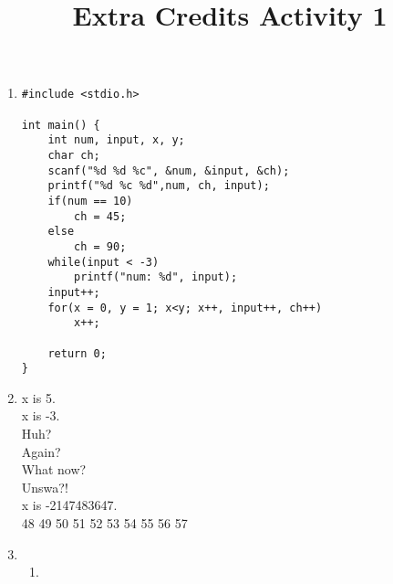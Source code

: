 \documentclass[12pt,letterpaper]{article}
\title{Extra Credits Activity 1}
\date{}
\begin{document}
    \maketitle

    \begin{enumerate}[label=\Roman*]
        \item 
        \begin{lstlisting}
#include <stdio.h>

int main() {
    int num, input, x, y;
    char ch;
    scanf("%d %d %c", &num, &input, &ch);
    printf("%d %c %d",num, ch, input);
    if(num == 10)
        ch = 45;
    else
        ch = 90;
    while(input < -3)
        printf("num: %d", input);
    input++;
    for(x = 0, y = 1; x<y; x++, input++, ch++)
        x++;

    return 0;
}
        \end{lstlisting}
    \item 
        x is 5.\\
        x is -3.\\
        Huh?\\
        Again?\\
        What now?\\
        Unswa?!\\
        x is -2147483647.\\
        48 49 50 51 52 53 54 55 56 57 \\
    \item \begin{enumerate}[label=\arabic*]
        \item 
    \end{enumerate}
    \end{enumerate}

    
\end{document}
